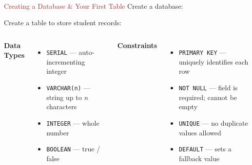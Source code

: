 \begin{frame}[fragile]{\textcolor{brown}{Creating a Database \& Your First Table}}
Create a database:


\begin{block}{Create a table to store student records:}

\end{block}
  \begin{columns}[T]
      \textbf{Data Types}
      \begin{itemize}
        \item \texttt{SERIAL} — auto-incrementing integer
        \item \texttt{VARCHAR(n)} — string up to \textit{n} characters
        \item \texttt{INTEGER} — whole number
        \item \texttt{BOOLEAN} — true / false
      \end{itemize}

      \textbf{Constraints}
      \begin{itemize}
        \item \texttt{PRIMARY KEY} — uniquely identifies each row
        \item \texttt{NOT NULL} — field is required; cannot be empty
        \item \texttt{UNIQUE} — no duplicate values allowed
        \item \texttt{DEFAULT} — sets a fallback value
      \end{itemize}
  \end{columns}
\end{frame}